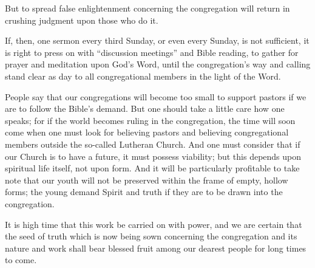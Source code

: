 But to spread false enlightenment concerning the congregation will return in crushing judgment upon those who do it.

If, then, one sermon every third Sunday, or even every Sunday, is not sufficient, it is right to press on with “discussion meetings” and Bible reading, to gather for prayer and meditation upon God’s Word, until the congregation’s way and calling stand clear as day to all congregational members in the light of the Word.

People say that our congregations will become too small to support pastors if we are to follow the Bible’s demand. But one should take a little care how one speaks; for if the world becomes ruling in the congregation, the time will soon come when one must look for believing pastors and believing congregational members outside the so-called Lutheran Church. And one must consider that if our Church is to have a future, it must possess viability; but this depends upon spiritual life itself, not upon form. And it will be particularly profitable to take note that our youth will not be preserved within the frame of empty, hollow forms; the young demand Spirit and truth if they are to be drawn into the congregation.

It is high time that this work be carried on with power, and we are certain that the seed of truth which is now being sown concerning the congregation and its nature and work shall bear blessed fruit among our dearest people for long times to come.



